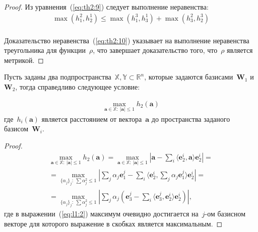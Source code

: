 \begin{proof}
Из уравнения~(\ref{eq:th2:9}) следует выполнение неравенства:
\begin{equation}
\label{eq:th2:10}
\begin{aligned}
\max\left(h_{1}^{2}, h_{2}^{1}\right) \leq  \max\left(h_{1}^{3}, h_{3}^{1}\right) + \max\left(h_{3}^{2}, h_{2}^{3}\right)\\
\end{aligned}
\end{equation}

Доказательство неравенства~(\ref{eq:th2:10}) указывает на выполнение неравенства треугольника для функции~$\rho$, что завершает доказательство того, что~$\rho$ является метрикой.

\end{proof}


\begin{lemma} \label{lem:1} 
Пусть заданы два подпространства~$\mathbb{X}, \mathbb{Y} \subset \mathbb{R}^{n}$, которые задаются базисами~$\textbf{W}_1$ и~$\textbf{W}_2$, тогда справедливо следующее условие:

\begin{equation}
\label{eq:l1:1}
\begin{aligned}
\max_{\textbf{a} \in \mathbb{X}:~\left|\textbf{a}\right|\leq 1}h_2\left(\textbf{a}\right)
\end{aligned}
\end{equation}
где~$h_i\left(\textbf{a}\right)$ является расстоянием от вектора~$\textbf{a}$ до пространства заданого базисом~$\textbf{W}_i$.
\end{lemma}

\begin{proof}
\begin{equation}
\label{eq:l1:2}
\begin{aligned}
\max_{\textbf{a} \in \mathbb{X}:~\left|\textbf{a}\right|\leq 1}h_2\left(\textbf{a}\right) = \max_{\textbf{a} \in \mathbb{X}:~\left|\textbf{a}\right|\leq 1}\left|\textbf{a}-\sum_{i}\langle \textbf{e}^i_2, \textbf{a} \rangle\textbf{e}^i_2 \right| = \\ 
=\max_{\{\alpha_j\}_{j}:~\sum\alpha_j^2\leq 1}\left|\sum_{j}\alpha_j\textbf{e}^{j}_1-\sum_{i}\langle \textbf{e}^i_2, \sum_{j}\alpha_j\textbf{e}^{j}_1 \rangle\textbf{e}^i_2 \right| =\\
= \max_{\{\alpha_j\}_{j}:~\sum\alpha_j^2\leq 1}\left|\sum_{j}\alpha_j\left(\textbf{e}_3^j - \sum_{i}\langle\textbf{e}_3^j,\textbf{e}_2^i\rangle\textbf{e}_2^i\right)\right|,
\end{aligned}
\end{equation}
где в выражении~(\ref{eq:l1:2}) максимум очевидно достигается на~$j$-ом базисном векторе для которого выражение в скобках является максимальным.
\end{proof}




